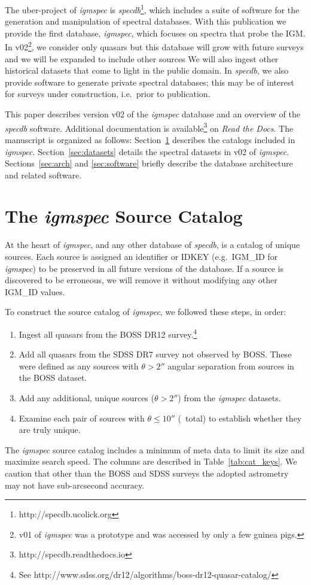 \documentclass[12pt]{elsarticle}
\begin{document}
The uber-project of {\it igmspec}
is {\it specdb}\footnote{http://specdb.ucolick.org}, 
which includes a suite of software for the generation 
and manipulation  of spectral databases.
With this publication we provide the first database,
{\it igmspec}, which focuses on spectra that probe the IGM. 
In v02\footnote{v01 of {\it igmspec} was a prototype and was
accessed by only a few guinea pigs.}, 
we consider only quasars but 
this database will grow with future surveys 
and we will be expanded to include other sources
\citep[e.g. gamma-ray burst afterglow spectra, star-forming
galaxies, supernovae;][]{fjp+09,rpk+10,cooke+12}
We will also ingest other historical 
datasets that come to light in
the public domain.  
In {\it specdb}, we also provide 
software to generate private spectral databases; 
this may be of interest for surveys 
under construction, i.e.\ prior to publication.

This paper describes version v02 of the {\it igmspec}
database and an overview of the {\it specdb} software.  
Additional documentation is available\footnote{http://specdb.readthedocs.io}
on {\it Read the Docs}.
The manuscript is organized as follows:
Section~\ref{sec:catalog} describes the catalogs
included in {\it igmspec}.
Section~\ref{sec:datasets} details the spectral datasets
in v02 of {\it igmspec}.
Sections~\ref{sec:arch} and \ref{sec:software}
briefly describe the database architecture and
related software.


\section{The {\it igmspec} Source Catalog}
\label{sec:catalog}

At the heart of {\it igmspec}, and any other database  
of {\it specdb}, is a catalog of unique sources.
Each source is assigned an identifier or IDKEY
(e.g.\ IGM\_ID for {\it igmspec})
to be preserved in all future versions of the database.
If a source is discovered to be erroneous, 
we will remove it without modifying
any other IGM\_ID values.

To construct the source catalog of {\it igmspec}, 
we followed these steps, in order:

\begin{enumerate}
\item Ingest all quasars from the BOSS DR12 survey.\footnote{See
http://www.sdss.org/dr12/algorithms/boss-dr12-quasar-catalog/}
\item Add all quasars from the SDSS DR7 survey not observed by BOSS.
These were defined as any sources with $\theta > 2''$ angular separation
from sources in the BOSS dataset.
\item Add any additional, unique sources ($\theta > 2''$)
from the {\it igmspec} datasets.
\item Examine each pair of sources with $\theta \le 10''$ 
(\npair\ total) to establish whether they are truly unique.
\end{enumerate}
The {\it igmspec} source catalog includes a minimum of meta data
to limit its size and maximize search speed.
The columns are described in Table~\ref{tab:cat_keys}.
We caution that other than the BOSS and SDSS surveys 
the adopted astrometry may not have sub-arcsecond accuracy.
\end{document}
